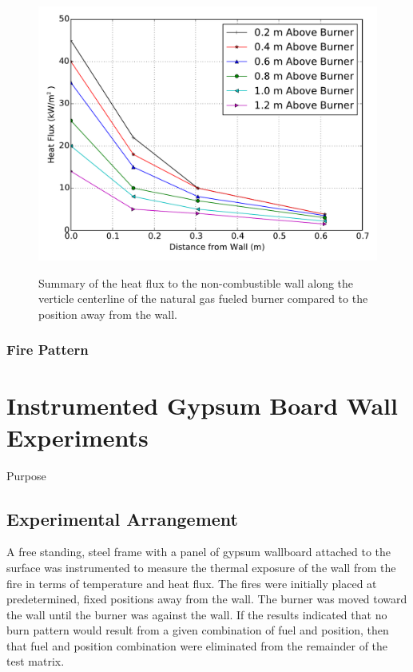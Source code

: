 \documentclass[twoside]{uocthesis}
\begin{document}
{{\begin{figure}
	\centering
	\includegraphics[width=\textwidth]{../Figures/nctw_ng_heatflux}\\
	\caption[Summary of wall heat fluxes along the centerline of the natural gas fueled burner]{Summary of the heat flux to the non-combustible wall along the verticle centerline of the natural gas fueled burner compared to the position away from the wall.}
	\label{nctw_ng_heatflux}
\end{figure}



\subsection{Fire Pattern}



\chapter{Instrumented Gypsum Board Wall Experiments}
Purpose
\section{Experimental Arrangement}
A free standing, steel frame with a panel of gypsum wallboard attached to the surface was instrumented to measure the thermal exposure of the wall from the fire in terms of temperature and heat flux.  The fires were initially placed at predetermined, fixed positions away from the wall. The burner was moved toward the wall until the burner was against the wall.  If the results indicated that no burn pattern would result from a given combination of fuel and position, then that fuel and position combination were eliminated from the remainder of the test matrix.

}}
\end{document}

